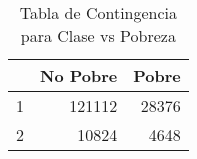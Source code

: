 \begin{table}[ht]
\centering
\begin{tabular}{rrr}
  \toprule
 & No Pobre & Pobre \\ 
  \midrule
1 & 121112 & 28376 \\ 
  2 & 10824 & 4648 \\ 
   \bottomrule
\end{tabular}
\caption{Tabla de Contingencia para Clase vs Pobreza} 
\label{tab:contingency_Clase}
\end{table}
